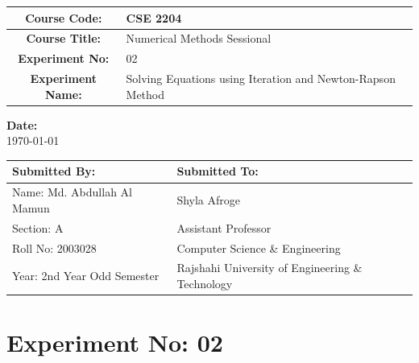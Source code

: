 \documentclass[a4paper,12pt]{report}
\begin{document}
\begin{titlepage}
\begin{center}
        \begin{table}[h]
            \centering
            \begin{tabularx}{0.7\paperwidth}{|c|X|}
                \hline
                \textbf{Course Code:}     & CSE 2204                                                   \\
                \hline
                \textbf{Course Title:}    & Numerical Methods Sessional                                \\
                \hline
                \textbf{Experiment No:}   & 02                                                         \\
                \hline
                \textbf{Experiment Name:} & Solving Equations using Iteration and Newton-Rapson Method \\
                \hline
            \end{tabularx}%
        \end{table}

        \vspace{0.5in}
        \textbf{Date:} \\
        \today

        \vfill

        \begin{table}[h]
            \centering
            \begin{tabularx}{0.7\paperwidth}{|X|X|}
                \hline
                Submitted By:               & Submitted To:                                    \\
                \hline
                Name: Md. Abdullah Al Mamun & Shyla Afroge                                     \\
                \hline
                Section: A                  & Assistant Professor                              \\
                \hline
                Roll No: 2003028            & Computer Science \& Engineering                  \\
                \hline
                Year: 2nd Year Odd Semester & Rajshahi University of Engineering \& Technology \\
                \hline
            \end{tabularx}
        \end{table}
    \end{center}
\end{titlepage}

\section*{Experiment No: 02}
\end{document}

